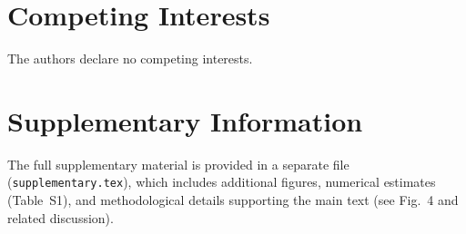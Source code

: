 \documentclass[aps,prl,twocolumn,superscriptaddress]{revtex4-2}
\begin{document}
\section*{Competing Interests}
The authors declare no competing interests.






\clearpage
\appendix
\section*{Supplementary Information}
The full supplementary material is provided in a separate file (\texttt{supplementary.tex}), 
which includes additional figures, numerical estimates (Table~S1), and methodological details supporting the main text (see Fig.~4 and related discussion).


\end{document}
